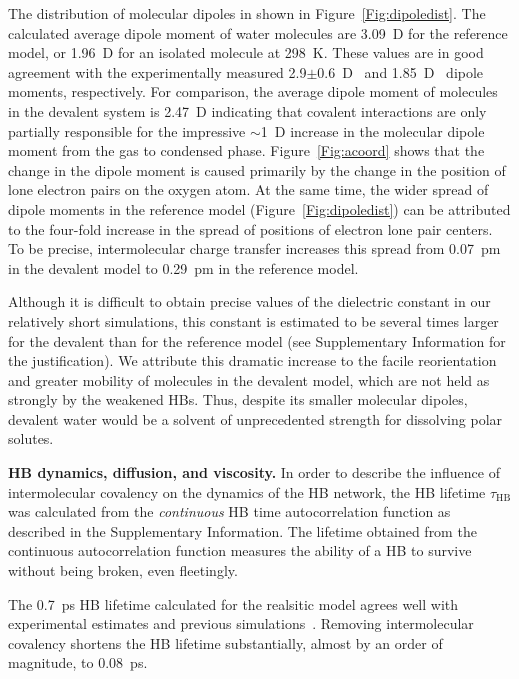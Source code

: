\documentclass[journal=jacsat,manuscript=article]{achemso}
\begin{document}
The distribution of molecular dipoles in shown in Figure~\ref{Fig:dipoledist}.  
The calculated average dipole moment of water molecules are 3.09~D for the reference model, or 1.96~D for an isolated molecule at 298~K.
These values are in good agreement with the experimentally measured 2.9$\pm$0.6~D~\cite{badyal2000electron} and 1.85~D~\cite{haynes2014crc} dipole moments, respectively. 
For comparison, the average dipole moment of molecules in the devalent system is 2.47~D indicating that covalent interactions are only partially responsible for the impressive $\sim$1~D increase in the molecular dipole moment from the gas to condensed phase. 
Figure~\ref{Fig:acoord} shows that the change in the dipole moment is caused primarily by the change in the position of lone electron pairs on the oxygen atom. 
At the same time, the wider spread of dipole moments in the reference model (Figure~\ref{Fig:dipoledist}) can be attributed to the four-fold increase in the spread of positions of electron lone pair centers. 
To be precise, intermolecular charge transfer increases this spread from 0.07~pm in the devalent model to 0.29~pm in the reference model.
%

Although it is difficult to obtain precise values of the dielectric constant in our relatively short simulations, this constant is estimated to be several times larger for the devalent than for the reference model (see Supplementary Information for the justification). 
We attribute this dramatic increase to the facile reorientation and greater mobility of molecules in the devalent model, which are not held as strongly by the weakened HBs. 
Thus, despite its smaller molecular dipoles, devalent water would be a solvent of unprecedented strength for dissolving polar solutes.

\textbf{HB dynamics, diffusion, and viscosity.} In order to describe the influence of intermolecular covalency on the dynamics of the HB network, the HB lifetime $\tau_{\text{HB}}$ was calculated from the \emph{continuous} HB time autocorrelation function as described in the Supplementary Information. The lifetime obtained from the continuous autocorrelation function measures the ability of a HB to survive without being broken, even fleetingly.

The 0.7~ps HB lifetime calculated for the realsitic model agrees well with experimental estimates \cite{lawrence2003ultrafast} and previous simulations~\cite{marti1996molecular,starr1999fast}. Removing intermolecular covalency shortens the HB lifetime substantially, almost by an order of magnitude, to 0.08~ps. 
\end{document}

